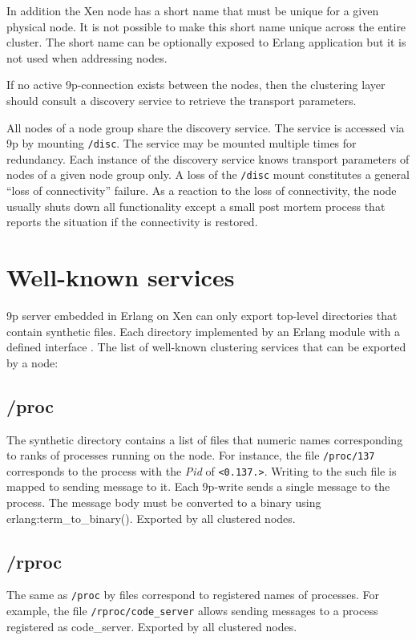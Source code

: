 \documentclass{scrartcl}
\begin{document}
In addition the Xen node has a short name that must be unique for a given
physical node. It is not possible to make this short name unique across the
entire cluster. The short name can be optionally exposed to Erlang application
but it is not used when addressing nodes.

If no active 9p-connection exists between the nodes, then the clustering layer
should consult a discovery service to retrieve the transport parameters.

All nodes of a node group share the discovery service. The service is accessed
via 9p by mounting \verb$/disc$. The service may be mounted multiple times for
redundancy. Each instance of the discovery service knows transport parameters of
nodes of a given node group only. A loss of the \verb$/disc$ mount constitutes a
general ``loss of connectivity'' failure. As a reaction to the loss of
connectivity, the node usually shuts down all functionality except a small post
mortem process that reports the situation if the connectivity is restored.

\section*{Well-known services}

9p server embedded in Erlang on Xen can only export top-level directories that
contain synthetic files. Each directory implemented by an Erlang module with a
defined interface \cite{9pfs}. The list of well-known clustering services that
can be exported by a node:

\subsection*{/proc}

The synthetic directory contains a list of files that numeric names
corresponding to ranks of processes running on the node. For instance, the file
\verb$/proc/137$ corresponds to the process with the \emph{Pid} of
\verb$<0.137.>$. Writing to the such file is mapped to sending message to it.
Each 9p-write sends a single message to the process. The message body must be
converted to a binary using erlang:term\_to\_binary(). Exported by all clustered
nodes.

\subsection*{/rproc}

The same as \verb$/proc$ by files correspond to registered names of processes.
For example, the file \verb$/rproc/code_server$ allows sending messages to a
process registered as code\_server. Exported by all clustered nodes.
\end{document}
